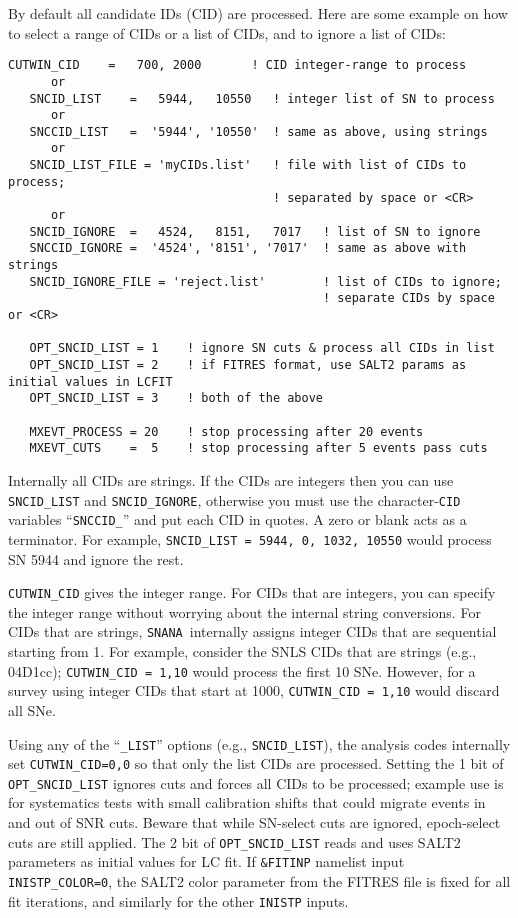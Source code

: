 \documentclass[12pt]{article}
\newcommand{\snana}{{\tt SNANA}}
\begin{document}
By default all candidate IDs (CID) are processed.
Here are some example on how to select a range
of CIDs or a list of CIDs, and to ignore
a list of CIDs:
%
\begin{Verbatim}[frame=single]
   CUTWIN_CID    =   700, 2000       ! CID integer-range to process
      or
   SNCID_LIST    =   5944,   10550   ! integer list of SN to process
      or
   SNCCID_LIST   =  '5944', '10550'  ! same as above, using strings
      or
   SNCID_LIST_FILE = 'myCIDs.list'   ! file with list of CIDs to process;
                                     ! separated by space or <CR>
      or
   SNCID_IGNORE  =   4524,   8151,   7017   ! list of SN to ignore
   SNCCID_IGNORE =  '4524', '8151', '7017'  ! same as above with strings
   SNCID_IGNORE_FILE = 'reject.list'        ! list of CIDs to ignore; 
                                            ! separate CIDs by space or <CR>

   OPT_SNCID_LIST = 1    ! ignore SN cuts & process all CIDs in list 
   OPT_SNCID_LIST = 2    ! if FITRES format, use SALT2 params as initial values in LCFIT
   OPT_SNCID_LIST = 3    ! both of the above

   MXEVT_PROCESS = 20    ! stop processing after 20 events
   MXEVT_CUTS    =  5    ! stop processing after 5 events pass cuts
\end{Verbatim}
%
Internally all CIDs are strings. If the CIDs are integers
then you can use {\tt SNCID\_LIST} and {\tt SNCID\_IGNORE},
otherwise you must use the character-{\tt CID} variables
``{\tt SNCCID\_}''  and put each CID in quotes. 
A zero or blank acts as a terminator. For example, 
{\tt SNCID\_LIST = 5944, 0, 1032, 10550}
would process SN 5944 and ignore the rest.

 
{\tt CUTWIN\_CID} gives the integer range.
For CIDs that are integers, you can specify the integer range
without worrying about the internal string conversions.
For CIDs that are strings, \snana\ internally assigns
integer CIDs that are sequential starting from 1. 
For example, consider the SNLS CIDs that are strings (e.g., 04D1cc);
{\tt CUTWIN\_CID = 1,10} would process the first 10 SNe.
However, for a survey using integer CIDs that start at 1000,
{\tt CUTWIN\_CID = 1,10} would discard all SNe.


Using any of the ``{\tt \_LIST}'' options (e.g., {\tt SNCID\_LIST}),
the analysis codes internally set {\tt CUTWIN\_CID=0,0}
so that only the list CIDs are processed.
Setting the 1 bit of {\tt OPT\_SNCID\_LIST} ignores cuts and
forces all CIDs to be processed; example use is for systematics
tests with small calibration shifts that could migrate events
in and out of SNR cuts. Beware that while SN-select cuts are ignored,
epoch-select cuts are still applied.
The 2 bit of {\tt OPT\_SNCID\_LIST} reads and uses SALT2 parameters as initial
values for LC fit. If {\tt \&FITINP} namelist input {\tt INISTP\_COLOR=0}, 
the SALT2 color parameter from the FITRES file is fixed for all fit iterations,
and similarly for the other {\tt INISTP} inputs.   
\end{document}
